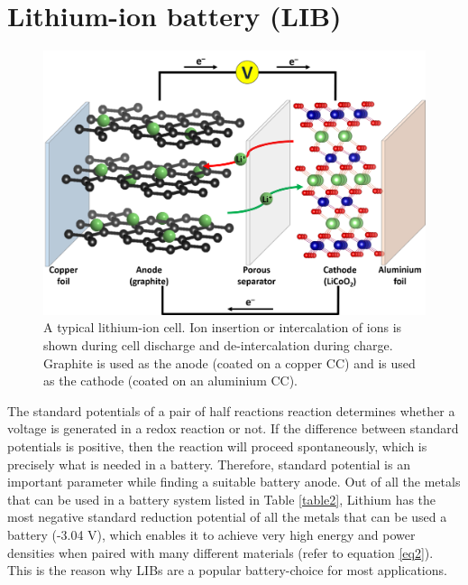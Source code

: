 \section{Lithium-ion battery (LIB)}
\begin{figure}[tbh!]
\centering
\includegraphics[width=\textwidth]{Figures/chap1fig/LIB}
\caption{A typical lithium-ion cell. Ion insertion or intercalation of  ions is shown during cell discharge and de-intercalation during charge. Graphite is used as the anode (coated on a copper CC) and  is used as the cathode (coated on an aluminium CC).}
\label{Figures/chap1fig:LIB}
\end{figure}

The standard potentials of a pair of half reactions reaction determines whether a voltage is generated in a redox reaction or not. If the difference between standard potentials is positive, then the reaction will proceed spontaneously, which is precisely what is needed in a battery. Therefore, standard potential is an important parameter while finding a suitable battery anode\cite{liu_understanding_2016}. Out of all the metals that can be used in a battery system listed in Table \ref{table2}, Lithium has the most negative standard reduction potential of all the metals that can be used a battery (-3.04 V), which enables it to achieve very high energy and power densities when paired with many different materials (refer to equation \ref{eq2}). This is the reason why LIBs are a popular battery-choice for most applications.

